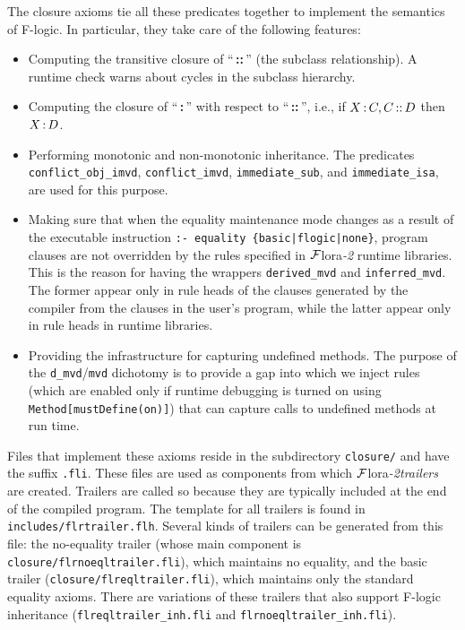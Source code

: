 \documentclass[11pt]{article}
\newcommand{\FLSYSTEM}{{\mbox{\sc ${\cal F}${lora}\rm\emph{-2}}}\xspace}
\newcommand{\isa}{\,{\bf{:}}\,}
\newcommand{\subcl}{\,{\bf{::}}\,}
\newcommand{\fl}{\mbox{F-logic}\xspace}
\begin{document}
The closure axioms tie all these predicates together to implement the
semantics of \fl. In particular, they take care of the following features:
\begin{itemize}
\item Computing the transitive closure of ``\subcl'' (the subclass
  relationship).  A runtime check warns about cycles in the subclass
  hierarchy.
\item Computing the closure of ``\isa'' with respect to ``\subcl'', i.e.,
  if $X\isa C, C\subcl D$ then $X\isa D$.
\item Performing monotonic and non-monotonic inheritance. The predicates
  {\tt conflict\_obj\_imvd}, {\tt conflict\_imvd}, {\tt immediate\_sub},
  and {\tt immediate\_isa}, are used for this purpose.
\item Making sure that when the equality maintenance mode changes as a
  result of the executable instruction {\tt :- equality
  \{basic|flogic|none\}}, program clauses are not overridden by the
  rules specified in \FLSYSTEM runtime libraries. This is the reason for
  having the wrappers {\tt derived\_mvd} and {\tt inferred\_mvd}. The former
  appear only in rule heads of the clauses generated by the compiler
  from the clauses in the user's program, while the latter appear only in
  rule heads in runtime libraries.
\item Providing the infrastructure for capturing undefined methods.
  The purpose of the {\tt d\_mvd}/{\tt mvd} dichotomy is to provide a gap
  into which we inject rules
  (which are enabled only if runtime debugging is turned on using
  {\tt Method[mustDefine(on)]}) that can capture calls to undefined
  methods at run time.
\end{itemize}
Files that implement these axioms reside in the subdirectory
\texttt{closure/} and have the suffix {\tt .fli}.  These files are used as
components from which \FLSYSTEM \emph{trailers} are created.  Trailers are
called so because they are typically included at the end of the compiled
program. The template for all trailers is found in
{\tt includes/flrtrailer.flh}.  Several kinds of trailers can be generated from
this file: the no-equality trailer (whose main component is {\tt
  closure/flrnoeqltrailer.fli}), which maintains no equality, and the basic
trailer ({\tt closure/flreqltrailer.fli}), which maintains only the
standard equality axioms.
There are variations of these trailers that also support \fl inheritance
({\tt flreqltrailer\_inh.fli}  and {\tt flrnoeqltrailer\_inh.fli}).
\end{document}
